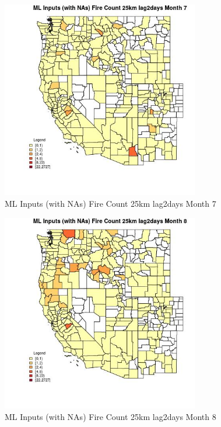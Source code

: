 \begin{figure} 
\centering  
\includegraphics[width=0.77\textwidth]{Code_Outputs/Report_ML_input_PM25_Step4_part_f_de_duplicated_aves_prioritize_24hr_obswNAs_CountyFire_Count_25km_lag2daysmedianMonth7.jpg} 
\caption{\label{fig:Report_ML_input_PM25_Step4_part_f_de_duplicated_aves_prioritize_24hr_obswNAsCountyFire_Count_25km_lag2daysmedianMonth7}ML Inputs (with NAs) Fire Count 25km lag2days Month 7} 
\end{figure} 
 

\begin{figure} 
\centering  
\includegraphics[width=0.77\textwidth]{Code_Outputs/Report_ML_input_PM25_Step4_part_f_de_duplicated_aves_prioritize_24hr_obswNAs_CountyFire_Count_25km_lag2daysmedianMonth8.jpg} 
\caption{\label{fig:Report_ML_input_PM25_Step4_part_f_de_duplicated_aves_prioritize_24hr_obswNAsCountyFire_Count_25km_lag2daysmedianMonth8}ML Inputs (with NAs) Fire Count 25km lag2days Month 8} 
\end{figure} 
 

